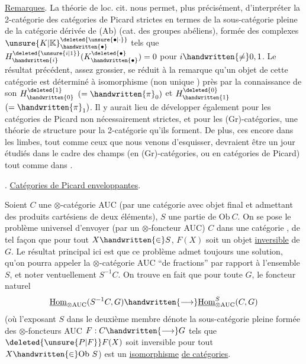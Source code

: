 \uline{Remarques}. La théorie de loc. cit. nous permet, plus précisément, d'interpréter la 2-catégorie des catégories de Picard strictes en termes de la sous-catégorie pleine de la catégorie dérivée de (Ab) (cat. des groupes abéliens), formée des complexes ${\unsure{K|\mathbb{K}}}^{\deleted{\unsure{\bullet|\cdot}}}_{\handwritten{\bullet}}$ tels que $H^{\deleted{\unsure{i|1}}}_{\handwritten{i}}(K^{\deleted{\bullet}}_{\handwritten{\bullet}})=0$ pour $i\handwritten{\ne}0,1$. Le résultat précédent, assez grossier, se réduit  à la remarque qu'un objet de cette catégorie est déterminé à isomorphisme (non unique \handwritten{!}) près par la connaissance de son $H^{\deleted{1}}_{\handwritten{0}}$ $(=\handwritten{\pi}_{0})$ et $H^{\deleted{0}}_{\handwritten{1}}$ $(=\handwritten{\pi}_{1})$. Il y aurait lieu de développer également pour les catégories de Picard non nécessairement strictes, et pour les (Gr)-catégories, une théorie de structure pour la 2-catégorie qu'ils forment. De plus, ces  encore dans les limbes, tout comme ceux que  nous venons d'esquisser, devraient être un jour  étudiés dans le cadre des champs (en (Gr)-catégories, ou en catégories de Picard) tout comme dans  \handwritten{[\, ]}.

 . \uline{Catégories de Picard enveloppantes}.

Soient $C$ une  $\otimes$-catégorie AUC (par  une catégorie avec objet final et admettant des produits cartésiens de deux éléments), $S$ une partie de $\mathrm{Ob}\ C$. On se pose le problème universel d'envoyer (par un $\otimes$-foncteur AUC) $C$ dans une \inserted{$\otimes$-}catégorie , de tel façon que pour tout $X\handwritten{\in} S$, $F(X)$ soit un objet \uline{inversible} de $G$. Le résultat principal ici est que ce problème admet toujours une solution, qu'on pourra appeler la $\otimes$-catégorie AUC ``de fractions'' par rapport à l'ensemble $S$, et noter ventuellement $S^{-1}C$. On trouve en fait que pour toute $G$, le foncteur naturel
\[
\underline{\mathrm{Hom}}_{\otimes\mathrm{AUC}}(S^{-1}C,G)\handwritten{\longrightarrow}\underline{\mathrm{Hom}}_{\otimes\mathrm{AUC}}^{S}(C,G)
\]
(où l'exposant $S$ dans le deuxième membre dénote la sous-catégorie pleine formée des $\otimes$-foncteurs AUC $F:C\handwritten{\longrightarrow}G$ tels que $\deleted{\unsure{P|F}}F(X)$ soit inversible pour tout $X\handwritten{\in}\mathrm{Ob}\ S$) est un \uline{isomorphisme} \uline{de catégories}.


